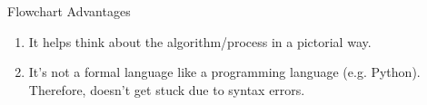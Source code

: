 \documentclass{beamer}
\begin{document}
\begin{frame}[fragile]{Flowchart}
{Advantages}

\begin{enumerate}
\item It helps think about the algorithm/process in a pictorial way.
\item It's not a formal language like a programming language (e.g. Python). Therefore, doesn't get stuck due to syntax errors.
\end{enumerate}
\end{frame}
\end{document}
